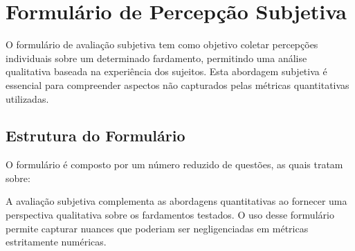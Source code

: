 \chapter{Formulário de Percepção Subjetiva}

O formulário de avaliação subjetiva tem como objetivo coletar percepções individuais sobre um determinado fardamento, permitindo uma análise qualitativa baseada na experiência dos sujeitos. Esta abordagem subjetiva é essencial para compreender aspectos não capturados pelas métricas quantitativas utilizadas.

\section{Estrutura do Formulário}
O formulário é composto por um número reduzido de questões, as quais tratam sobre:


\tab A avaliação subjetiva complementa as abordagens quantitativas ao fornecer uma perspectiva qualitativa sobre os fardamentos testados. O uso desse formulário permite capturar nuances que poderiam ser negligenciadas em métricas estritamente numéricas.